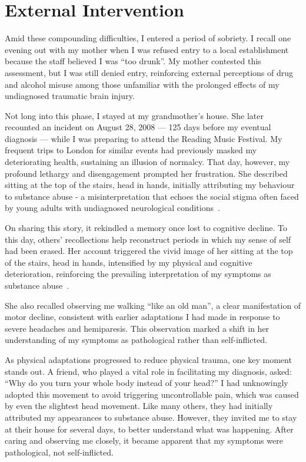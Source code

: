 \documentclass{article}
\begin{document}
\section*{External Intervention}
Amid these compounding difficulties, I entered a period of sobriety. I recall one evening out with my mother when I was refused entry to a local establishment because the staff believed I was “too drunk”. My mother contested this assessment, but I was still denied entry, reinforcing external perceptions of drug and alcohol misuse among those unfamiliar with the prolonged effects of my undiagnosed traumatic brain injury.

Not long into this phase, I stayed at my grandmother's house. She later recounted an incident on August 28, 2008 --- 125 days before my eventual diagnosis --- while I was preparing to attend the Reading Music Festival. My frequent trips to London for similar events had previously masked my deteriorating health, sustaining an illusion of normalcy. That day, however, my profound lethargy and disengagement prompted her frustration. She described sitting at the top of the stairs, head in hands, initially attributing my behaviour to substance abuse - a misinterpretation that echoes the social stigma often faced by young adults with undiagnosed neurological conditions~\cite{livingston2012,corrigan2017}.

On sharing this story, it rekindled a memory once lost to cognitive decline. To this day, others' recollections help reconstruct periods in which my sense of self had been erased. Her account triggered the vivid image of her sitting at the top of the stairs, head in hands, intensified by my physical and cognitive deterioration, reinforcing the prevailing interpretation of my symptoms as substance abuse~\cite{yang2017,hammarlund2018,zwick2020,mcginty2020,bielenberg2021,lankenau2012}.

She also recalled observing me walking “like an old man”, a clear manifestation of motor decline, consistent with earlier adaptations I had made in response to severe headaches and hemiparesis. This observation marked a shift in her understanding of my symptoms as pathological rather than self-inflicted.

As physical adaptations progressed to reduce physical trauma, one key moment stands out. A friend, who played a vital role in facilitating my diagnosis, asked:
“Why do you turn your whole body instead of your head?”
I had unknowingly adopted this movement to avoid triggering uncontrollable pain, which was caused by even the slightest head movement. Like many others, they had initially attributed my appearances to substance abuse. However, they invited me to stay at their house for several days, to better understand what was happening. After caring and observing me closely, it became apparent that my symptoms were pathological, not self-inflicted.
\end{document}
